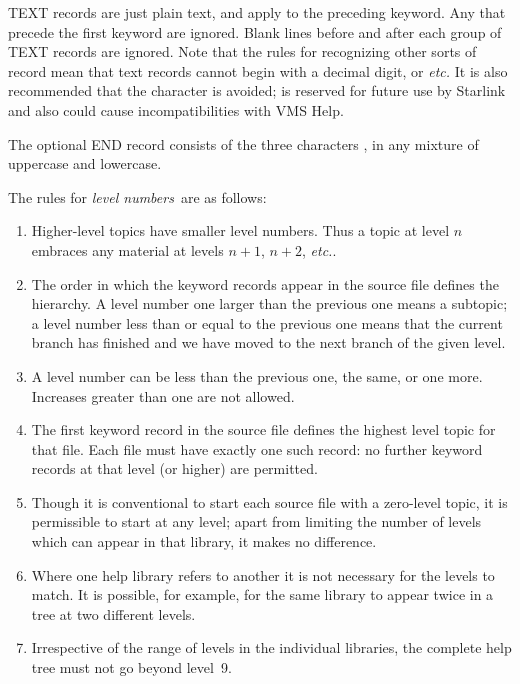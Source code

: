 TEXT records are just plain text, and apply to the preceding keyword.
Any that precede the first keyword are
ignored.  Blank lines before and after each group of TEXT records
are ignored.  Note that the rules for recognizing other sorts of
record mean that text records cannot begin with a decimal digit,
 or  {\it etc.}  It
is also recommended that the character \fstring{/} is avoided;
\fstring{/} is reserved for future use by Starlink and also could
cause incompatibilities with VMS Help.

The optional END record consists of the three characters , in
any mixture of uppercase and lowercase.

The rules for {\it level numbers}\, are as follows:
\begin{enumerate}
\item Higher-level topics have smaller level numbers.  Thus a topic at
level $n$ embraces any material at levels $n+1$, $n+2$, {\it etc.}.
\item The order in which the keyword records appear in the source file
defines the hierarchy.  A level number one larger than the previous
one means a subtopic; a level number less than or equal to the previous one
means that the current branch has finished and we have moved
to the next branch of the given level.
\item A level number can be less than the previous one, the same,
or one more.  Increases greater than one are not allowed.
\item The first keyword record in the source file defines the
highest level topic for that file.  Each file must have exactly
one such record:  no further keyword records at that level (or higher)
are permitted.
\item Though it is conventional to start each source file with a
zero-level topic, it is permissible to start at any level; apart
from limiting the number of levels which can appear in that
library, it makes no difference.
\item Where one help library refers to another it is not necessary for
the levels to match.  It is possible, for example, for the same
library to appear twice in a tree at two different levels.
\item Irrespective of the range of levels in the
individual libraries, the complete help tree must not go beyond
level~9.
\end{enumerate}

